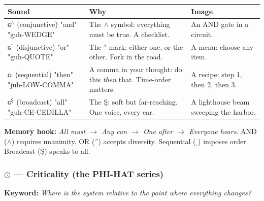 \documentclass[12pt,a4paper]{article}
\begin{document}
\begin{table}[htbp]
\centering
\small
{}
\begin{tabularx}{\textwidth}{>{\centering\arraybackslash}X >{\centering\arraybackslash}X >{\centering\arraybackslash}X}
\toprule
\rowcolor{gray!25}\textbf{Sound} & \textbf{Why} & \textbf{Image} \\
\midrule
\rowcolors{1}{white}{gray!10}
\textbf{$ɢ^{\wedge}$} (conjunctive) "and" "guh-WEDGE" & The $\land$ symbol: everything must be true. A checklist. & An AND gate in a circuit. \\
\textbf{$ɢ^{\text{˝}}$} (disjunctive) "or" "guh-QUOTE" & The " mark: either one, or the other. Fork in the road. & A menu: choose any item. \\
\textbf{$ɢ^{\text{ˌ}}$} (sequential) "then" "juh-LOW-COMMA" & A comma in your thought: do this \emph{then} that. Time-order matters. & A recipe: step 1, then 2, then 3. \\
\textbf{$ɢ^{\text{Ş}}$} (broadcast) "all" "guh-CE-CEDILLA" & The Ş: soft but far-reaching. One voice, every ear. & A lighthouse beam sweeping the harbor. \\
\bottomrule
\end{tabularx}
\end{table}

\textbf{Memory hook:} \emph{All must $\rightarrow$ Any can $\rightarrow$ One after $\rightarrow$ Everyone hears}. AND ($\land$) requires unanimity. OR (˝) accepts diversity. Sequential (ˌ) imposes order. Broadcast (Ş) speaks to all.

\subsubsection{$⊙$ --- Criticality (the \textbf{PHI-HAT} series)}

\textbf{Keyword:} \emph{Where is the system relative to the point where everything changes?}
\end{document}

